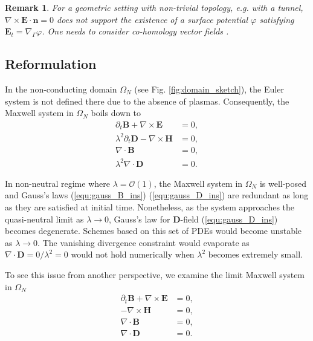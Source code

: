 \documentclass{article}
\newtheorem*{remark}{Remark}
\begin{document}
\begin{remark} For a geometric setting with non-trivial topology, e.g. with a tunnel, $\nabla \times \mathbf{E}\cdot\mathbf{n} = 0$ does not support the existence of a surface potential $\varphi$ satisfying $\mathbf{E}_t = \nabla_\Gamma\varphi$. One needs to consider co-homology vector fields \cite{Hiptmair_2021}.
\end{remark}



\subsection{Reformulation} \label{sec:reform_continuous}
In the non-conducting domain $\Omega_N$ (see Fig. \ref{fig:domain_sketch}), the Euler system is not defined there due to the absence of plasmas. Consequently, the Maxwell system in $\Omega_N$ boils down to
\begin{subequations}
\begin{align}
    \partial_t \mathbf{B} + \nabla \times \mathbf{E} &= 0, \label{equ:faraday_ins}\\ 
    \lambda^2 \partial_t \mathbf{D} - \nabla \times \mathbf{H} &= 0,  \label{equ:ampere_ins}\\
    \nabla \cdot \mathbf{B} &= 0, \label{equ:gauss_B_ins}\\
    \lambda^2 \nabla \cdot \mathbf{D} &= 0 \label{equ:gauss_D_ins}.
\end{align}
\end{subequations}

In non-neutral regime where $\lambda = \mathcal{O}(1)$, the Maxwell system in $\Omega_N$ is well-posed and Gauss's laws (\ref{equ:gauss_B_ins}) (\ref{equ:gauss_D_ins}) are redundant as long as they are satisfied at initial time. Nonetheless, as the system approaches the quasi-neutral limit as $\lambda \rightarrow 0$, Gauss's law for $\mathbf{D}$-field (\ref{equ:gauss_D_ins}) becomes degenerate. Schemes based on this set of PDEs would become unstable as $\lambda \rightarrow 0$. The vanishing divergence constraint would evaporate as $\nabla \cdot \mathbf{D} = 0/\lambda^2 = 0$ would not hold numerically when $\lambda^2$ becomes extremely small. 

To see this issue from another perspective, we examine the limit Maxwell system in $\Omega_N$
\begin{subequations}
\begin{align}
    \partial_t \mathbf{B} + \nabla \times \mathbf{E} &= 0, \label{equ:faraday_ins_limit}\\ 
    - \nabla \times \mathbf{H} &= 0,  \label{equ:ampere_ins_limit}\\
    \nabla \cdot \mathbf{B} &= 0, \label{equ:gauss_B_ins_limit}\\
    \nabla \cdot \mathbf{D} &= 0 \label{equ:gaus_D_ins_limit}.
\end{align}
\end{subequations}
\end{document}
